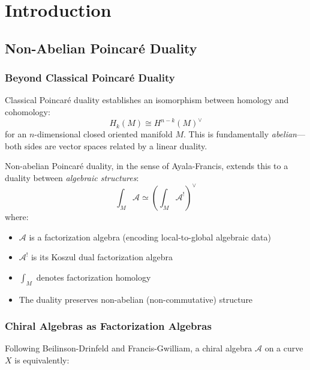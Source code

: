 \chapter{Introduction}

\section{ Non-Abelian Poincaré Duality}
\label{sec:nonabelian-poincare-intro}

\subsection{Beyond Classical Poincaré Duality}

Classical Poincaré duality establishes an isomorphism between homology and cohomology:
\begin{equation}
H_k(M) \cong H^{n-k}(M)^\vee
\end{equation}
for an $n$-dimensional closed oriented manifold $M$. This is fundamentally \emph{abelian}—both sides are vector spaces related by a linear duality.

\begin{principle}
\label{prin:nonabelian-poincare}
Non-abelian Poincaré duality, in the sense of Ayala-Francis, extends this to a duality between \emph{algebraic structures}:
\begin{equation}
\int_M \mathcal{A} \simeq \left(\int_M \mathcal{A}^!\right)^\vee
\end{equation}
where:
\begin{itemize}
\item $\mathcal{A}$ is a factorization algebra (encoding local-to-global algebraic data)
\item $\mathcal{A}^!$ is its Koszul dual factorization algebra
\item $\int_M$ denotes factorization homology
\item The duality preserves non-abelian (non-commutative) structure
\end{itemize}
\end{principle}

\subsection{Chiral Algebras as Factorization Algebras}

Following Beilinson-Drinfeld and Francis-Gwilliam, a chiral algebra $\mathcal{A}$ on a curve $X$ is equivalently:

